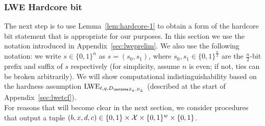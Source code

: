 

\subsubsection{LWE Hardcore bit}
\label{sec:lwehc}

The next step is to use Lemma~\ref{lem:hardcore-1} to obtain a form of the hardcore bit statement that is appropriate for our purposes. In this section we use the notation introduced in Appendix~\ref{sec:lweprelim}. We also use the following notation: we write $s\in\{0,1\}^n$ as $s = (s_0,s_1)$, where $s_0,s_1\in\{0,1\}^{\frac{n}{2}}$ are the $\frac{n}{2}$-bit prefix and suffix of $s$ respectively (for simplicity, assume $n$ is even; if not, ties can be broken arbitrarily). We will show computational indistinguishability based on the hardness assumption $\lwe_{\ell,q,D_{\mZ_q,B_L}}$ (described at the start of Appendix~\ref{sec:lwetcf}).\\ 

For reasons that will become clear in the next section, we consider procedures that output a tuple $(b,x,d,c)\in \{0,1\}\times \mathcal{X}\times \{0,1\}^w \times \{0,1\}$.

